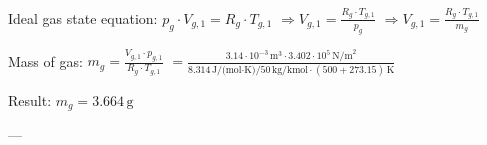 Ideal gas state equation:  
\( p_g \cdot V_{g,1} = R_g \cdot T_{g,1} \)  
\( \Rightarrow V_{g,1} = \frac{R_g \cdot T_{g,1}}{p_g} \)  
\( \Rightarrow V_{g,1} = \frac{R_g \cdot T_{g,1}}{m_g} \)  

Mass of gas:  
\( m_g = \frac{V_{g,1} \cdot p_{g,1}}{R_g \cdot T_{g,1}} \)  
\( = \frac{3.14 \cdot 10^{-3} \, \text{m}^3 \cdot 3.402 \cdot 10^5 \, \text{N/m}^2}{8.314 \, \text{J/(mol·K)} / 50 \, \text{kg/kmol} \cdot (500 + 273.15) \, \text{K}} \)  

Result:  
\( m_g = 3.664 \, \text{g} \)  

---